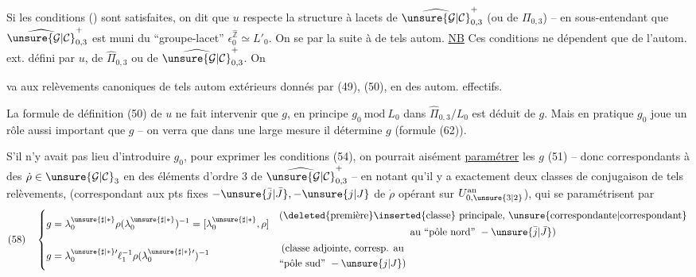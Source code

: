 Si les conditions  () sont satisfaites, on dit que $u$ respecte la structure à lacets de $\widehat{\unsure{\mathcal{G}|\mathcal{C}}}_{0,3}^{+}$ (ou de $\Pi_{0,3}$) -- en sous-entendant que $\widehat{\unsure{\mathcal{G}|\mathcal{C}}}_{0,3}^{+}$ est muni du ``groupe-lacet'' $\epsilon_0^{\widehat{\mathbb Z}}\simeq L'_0$. On se  par la suite à de tels autom. \uline{NB} Ces conditions ne dépendent que de l'autom. ext. défini par $u$, de $\widehat{\Pi}_{0,3}$ ou de $\widehat{\unsure{\mathcal{G}|\mathcal{C}}}_{0,3}^{+}$. On


va  aux relèvements canoniques de tels autom extérieurs donnés par (49), (50), en des autom. effectifs.

La formule de définition (50) de $u$ ne fait intervenir que $g$, en principe $g_0\ \mathrm{mod}\ L_0$ dans $\widehat{\Pi}_{0,3}/L_0$ est déduit de $g$. Mais en pratique $g_0$ joue un rôle aussi important que $g$ -- on verra que dans une large mesure il détermine $g$ (formule (62)).

S'il n'y avait pas lieu d'introduire $g_0$, pour exprimer les conditions (54), on pourrait aisément \uline{paramétrer} les $g$  (51) -- donc correspondants à des  $\dot\rho\in\unsure{\mathcal{G}|\mathcal{C}}_3$ en des éléments d'ordre $3$ de $\widehat{\unsure{\mathcal{G}|\mathcal{C}}}_{0,3}^{+}$ -- en notant qu'il y a exactement deux classes de conjugaison de tels relèvements, (correspondant aux pts fixes $-\unsure{\bar j|\bar J},-\unsure{j|J}$ de $\dot\rho$ opérant sur $U_{0,\unsure{3|2}}^{\mathrm{an}}$), qui se paramétrisent par
\[
(58)\quad
\left\{\begin{aligned}
g&=\lambda_0^{\unsure{\sharp|\ast}}\rho(\lambda_0^{\unsure{\sharp|\ast}})^{-1}
=[\lambda_0^{\unsure{\sharp|\ast}},\rho]
&&\begin{gathered}\text{(\deleted{première}\inserted{classe} principale, \unsure{correspondante|correspondant}}\\
\text{au ``pôle nord'' }-\unsure{\bar j|\bar J})\end{gathered}\\
g&=\lambda_0^{\unsure{\sharp|\ast}\prime}\ell_1^{-1}\rho(\lambda_0^{\unsure{\sharp|\ast}\prime})^{-1}
&&\begin{gathered}\text{(classe adjointe, corresp. au}\\
\text{``pôle sud'' }-\unsure{j|J})\end{gathered}
\end{aligned}\right.
\]

